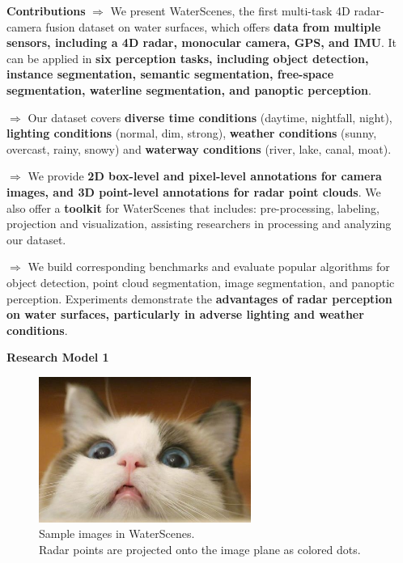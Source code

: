 \documentclass[final]{beamer}
\newlength{\sepwidthB}
\newlength{\colwidthB}
\newcommand{\separatorcolumnB}{\begin{column}{\sepwidthB}\end{column}}
\begin{document}
\begin{frame}[t]
\begin{columns}
\separatorcolumnB
\begin{column}[T]{\colwidthB}
\begin{block}{\Large{\textbf{Contributions}}}
\vspace{0.5cm}
\large
$\Rightarrow$ We present WaterScenes, the first multi-task 4D radar-camera fusion dataset on water surfaces, which offers \textbf{data from multiple sensors, including a 4D radar, monocular camera, GPS, and IMU}. It can be applied in \textbf{six perception tasks, including object detection, instance segmentation, semantic segmentation, free-space segmentation, waterline segmentation, and panoptic perception}.

$\Rightarrow$ Our dataset covers \textbf{diverse time conditions} (daytime, nightfall, night), \textbf{lighting conditions} (normal, dim, strong), \textbf{weather conditions} (sunny, overcast, rainy, snowy) and \textbf{waterway conditions} (river, lake, canal, moat). 

$\Rightarrow$ We provide \textbf{2D box-level and pixel-level annotations for camera images, and 3D point-level annotations for radar point clouds}. We also offer a \textbf{toolkit} for WaterScenes that includes: pre-processing, labeling, projection and visualization, assisting researchers in processing and analyzing our dataset.

$\Rightarrow$ We build corresponding benchmarks and evaluate popular algorithms for object detection, point cloud segmentation, image segmentation, and panoptic perception. Experiments demonstrate the \textbf{advantages of radar perception on water surfaces, particularly in adverse lighting and weather conditions}.
\end{block}
    
\begin{block}{\Large{\textbf{Research Model 1}}}
\vspace{1cm}
\begin{figure}
\centering
\includegraphics[width=0.65\textwidth]{images/cat.jpeg}
\captionsetup{justification=centering} 
\caption{Sample images in WaterScenes. \protect\\Radar points are projected onto the image plane as colored dots.}
\end{figure}
\vspace{-1cm}


\end{block}
\end{column}
\end{columns}
\end{frame}
\end{document}
